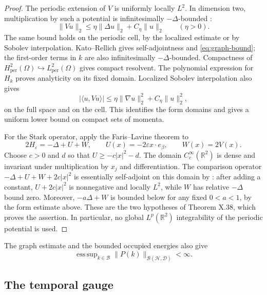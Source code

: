 \documentclass[11pt,a4paper]{article}
\newcommand{\R}{\mathbb R}
\newcommand{\B}{\mathcal B}
\newcommand{\HH}{\mathscr H}
\newcommand{\DD}{\mathscr D}
\newcommand{\ip}[2]{\langle #1,#2\rangle}
\newcommand{\norm}[1]{\lVert #1\rVert}
\numberwithin{equation}{section}
\begin{document}
\begin{proof}
The periodic extension of $V$ is uniformly locally $L^2$. In dimension
two, multiplication by such a potential is infinitesimally
$-\Delta$-bounded \cite[Theorem XIII.96]{RS4}:
\begin{equation}\label{eq:v-relative}
 \norm{Vu}_2\leq\eta\norm{\Delta u}_2+C_\eta\norm{u}_2
 \qquad(\eta>0).
\end{equation}
The same bound holds on the periodic cell, by the localized estimate
or by Sobolev interpolation. Kato--Rellich
\cite[Theorem X.12]{RS2} gives self-adjointness and
\eqref{eq:graph-bound}; the first-order terms in $k$ are also
infinitesimally $-\Delta$-bounded. Compactness of
$H^2_{\mathrm{per}}(\Omega)\hookrightarrow L^2_{\mathrm{per}}(\Omega)$
gives compact resolvent. The polynomial expression for $H_k$ proves
analyticity on its fixed domain. Localized Sobolev interpolation also
gives
\[
 |\ip{u}{Vu}|\leq\eta\norm{\nabla u}_2^2+C_\eta\norm{u}_2^2,
\]
on the full space and on the cell. This identifies the form domains and
gives a uniform lower bound on compact sets of momenta.

For the Stark operator, apply the Faris--Lavine theorem
\cite[Theorem X.38]{RS2} to
\[
 2H_\varepsilon=-\Delta+U+W,\qquad
 U(x)=-2\varepsilon x\cdot e_\beta,\qquad W(x)=2V(x).
\]
Choose $c>0$ and $d$ so that $U\geq-c|x|^2-d$. The domain
$C_c^\infty(\R^2)$ is dense and invariant under multiplication by $x_j$
and differentiation. The comparison operator
$-\Delta+U+W+2c|x|^2$ is essentially self-adjoint on this domain by
\cite[Theorem X.29]{RS2}: after adding a constant,
$U+2c|x|^2$ is nonnegative and locally $L^2$, while $W$ has relative
$-\Delta$ bound zero. Moreover, $-a\Delta+W$ is bounded below for any
fixed $0<a<1$, by the form estimate above. These are the two hypotheses
of Theorem X.38, which proves the assertion. In particular, no global
$L^p(\R^2)$ integrability of the periodic potential is used.
\end{proof}

The graph estimate and the bounded occupied energies also give
\begin{equation}\label{eq:projector-h2}
 \mathop{\mathrm{ess\,sup}}_{k\in\B}
 \norm{P(k)}_{\mathcal B(\HH,\DD)}<\infty.
\end{equation}

\subsection{The temporal gauge}
\end{document}
